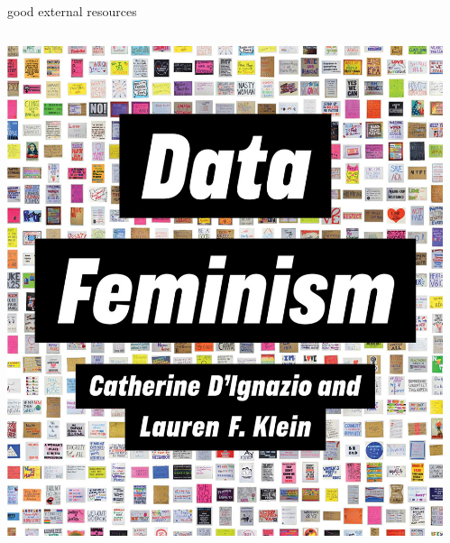 \documentclass[aspectratio=43,17pt]{beamer} %
\begin{document}
\begin{frame}{good external resources}

\begin{columns}
\begin{column}{0.33\textwidth}
\includegraphics[width=\textwidth]{figures/books/Data_Feminism.jpeg}
\end{column}
\begin{column}{0.33\textwidth}

\end{column}
\end{columns}
\end{frame}
\end{document}
